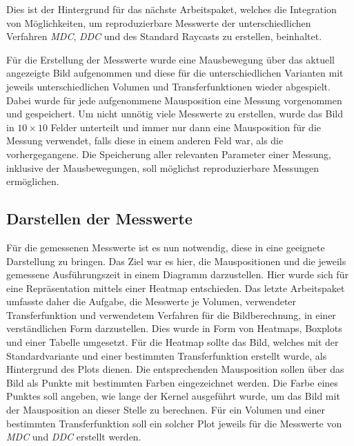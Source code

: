 Dies ist der Hintergrund für das nächste Arbeitspaket, welches die Integration von Möglichkeiten, um reproduzierbare Messwerte der unterschiedlichen Verfahren \emph{MDC}, \emph{DDC} und des Standard Raycasts zu erstellen, beinhaltet.

Für die Erstellung der Messwerte wurde eine Mausbewegung über das aktuell angezeigte Bild aufgenommen und diese für die unterschiedlichen Varianten mit jeweils unterschiedlichen Volumen und Transferfunktionen wieder abgespielt.
Dabei wurde für jede aufgenommene Mausposition eine Messung vorgenommen und gespeichert.
Um nicht unnötig viele Messwerte zu erstellen, wurde das Bild in $10\times10$ Felder unterteilt und immer nur dann eine Mausposition für die Messung verwendet, falls diese in einem anderen Feld war, als die vorhergegangene.
Die Speicherung aller relevanten Parameter einer Messung, inklusive der Mausbewegungen, soll möglichst reproduzierbare Messungen ermöglichen.

\subsection{Darstellen der Messwerte}
Für die gemessenen Messwerte ist es nun notwendig, diese in eine geeignete Darstellung zu bringen.
Das Ziel war es hier, die Mauspositionen und die jeweils gemessene Ausführungszeit in einem Diagramm darzustellen.
Hier wurde sich für eine Repräsentation mittels einer Heatmap entschieden.
Das letzte Arbeitspaket umfasste daher die Aufgabe, die Messwerte je Volumen, verwendeter Transferfunktion und verwendetem Verfahren für die Bildberechnung, in einer verständlichen Form darzustellen.
Dies wurde in Form von Heatmaps, Boxplots und einer Tabelle umgesetzt.
Für die Heatmap sollte das Bild, welches mit der Standardvariante und einer bestimmten Transferfunktion erstellt wurde, als Hintergrund des Plots dienen.
Die entsprechenden Mausposition sollen über das Bild als Punkte mit bestimmten Farben eingezeichnet werden.
Die Farbe eines Punktes soll angeben, wie lange der Kernel ausgeführt wurde, um das Bild mit der Mausposition an dieser Stelle zu berechnen.
Für ein Volumen und einer bestimmten Transferfunktion soll ein solcher Plot jeweils für die Messwerte von \emph{MDC} und \emph{DDC} erstellt werden.